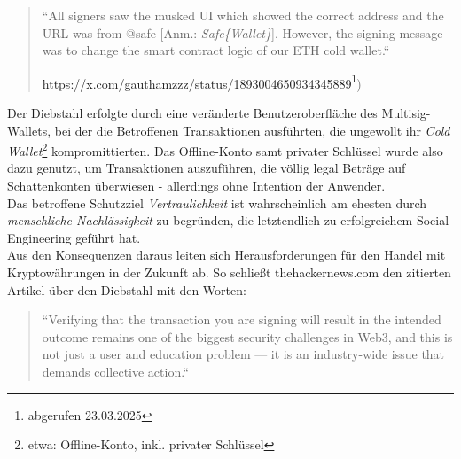 \blockquote[{\url{https://x.com/gauthamzzz/status/1893004650934345889}\footnote{abgerufen 23.03.2025})}]{
    ``All signers saw the musked UI which showed the correct address and the URL was from
    @safe [Anm.: \textit{Safe\{Wallet\}}]. However, the signing message was to change the smart contract logic of our ETH cold wallet.``
}

\noindent
Der Diebstahl erfolgte durch eine veränderte Benutzeroberfläche des Multisig-Wallets, bei der die Betroffenen Transaktionen ausführten, die ungewollt ihr \textit{Cold Wallet}\footnote{etwa: Offline-Konto, inkl. privater Schlüssel} kompromittierten.
Das Offline-Konto samt privater Schlüssel wurde also dazu genutzt, um Transaktionen auszuführen, die völlig legal Beträge auf Schattenkonten überwiesen - allerdings ohne Intention der Anwender.\\

\noindent
Das betroffene Schutzziel \textit{Vertraulichkeit} ist wahrscheinlich am ehesten durch \textit{menschliche Nachlässigkeit} zu begründen, die letztendlich zu erfolgreichem Social Engineering geführt hat.\\
Aus den Konsequenzen daraus leiten sich Herausforderungen für den Handel mit Kryptowährungen in der Zukunft ab.
So schließt thehackernews.com den zitierten Artikel über den Diebstahl mit den Worten:

\blockquote[]{
    ``Verifying that the transaction you are signing will result in the intended outcome remains one of the biggest security challenges in Web3, and this is not just a user and education problem — it is an industry-wide issue that demands collective action.``
}
